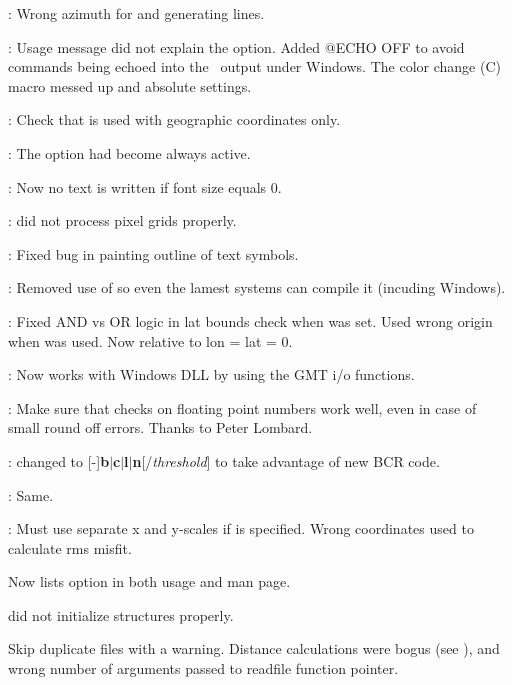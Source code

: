 \begin{description}
\item []: Wrong azimuth for  and  generating lines.
\item []: Usage message did not explain the  option.  Added @ECHO OFF to avoid
commands being echoed into the \PS\ output under Windows.
The color change (C) macro messed up  and  absolute settings.
\item []: Check that  is used with geographic coordinates only.
\item []: The  option had become always active.
\item []: Now no text is written if font size equals 0.
\item []:  did not process pixel grids properly.
\item []: Fixed bug in painting outline of text symbols.
\item []: Removed use of  so even the lamest systems can compile it (incuding
Windows).
\item []: Fixed AND vs OR logic in lat bounds check when  was set.
Used wrong origin when  was used.  Now relative to lon = lat = 0.
\item []: Now works with Windows DLL by using the GMT i/o functions.
\item []: Make sure that checks on floating point numbers work well, even
in case of small round off errors. Thanks to Peter Lombard.
\item []:  changed to [-]{\bf b$|$c$|$l$|$n}[/{\it threshold}] to
take advantage of new BCR code.
\item []: Same.
\item []: Must use separate x and y-scales if  is specified.
Wrong coordinates used to calculate rms misfit.
\item {} Now lists option  in both usage and man page.
\item {}  did not initialize structures properly.
\item {} Skip duplicate files with a warning. Distance calculations
were bogus (see ), and wrong number of arguments passed to readfile function pointer.
\end{description}

